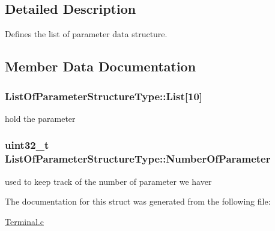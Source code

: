\subsection{Detailed Description}
Defines the list of parameter data structure. 

\subsection{Member Data Documentation}
\hypertarget{struct_list_of_parameter_structure_type_a9079f3b980c4a6f735367b19c375e6f9}{
\subsubsection[{List}]{ List\-Of\-Parameter\-Structure\-Type\-::\-List\mbox{[}10\mbox{]}}}\label{struct_list_of_parameter_structure_type_a9079f3b980c4a6f735367b19c375e6f9}


hold the parameter 

\hypertarget{struct_list_of_parameter_structure_type_a10041e965575f7a0a57158d2cc52b9e7}{
\subsubsection[{Number\-Of\-Parameter}]{\setlength{\rightskip}{0pt plus 5cm}uint32\-\_\-t List\-Of\-Parameter\-Structure\-Type\-::\-Number\-Of\-Parameter}}\label{struct_list_of_parameter_structure_type_a10041e965575f7a0a57158d2cc52b9e7}


used to keep track of the number of parameter we haver 



The documentation for this struct was generated from the following file\-:\begin{DoxyCompactItemize}
\item 
\hyperlink{_terminal_8c}{Terminal.\-c}\end{DoxyCompactItemize}
